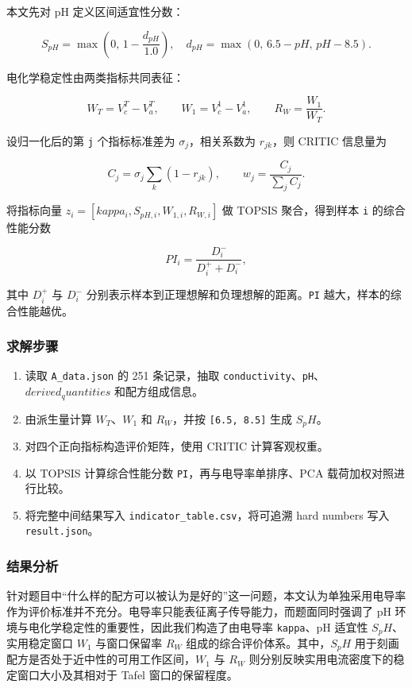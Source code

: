 \documentclass[bwprint]{gmcmthesis}
\numberwithin{figure}{section}
\begin{document}
本文先对 pH 定义区间适宜性分数：\par

\[
S_{pH}=\max \left(0,\, 1-\frac{d_{pH}}{1.0}\right),
\quad
d_{pH}=\max(0,\, 6.5-pH,\, pH-8.5).
\]

电化学稳定性由两类指标共同表征：\par

\[
W_T = V_c^T - V_a^T,\qquad
W_1 = V_c^1 - V_a^1,\qquad
R_W = \frac{W_1}{W_T}.
\]

设归一化后的第 \texttt{j} 个指标标准差为 $\sigma_j$，相关系数为 $r_{jk}$，则 CRITIC 信息量为\par

\[
C_j = \sigma_j \sum_k (1-r_{jk}), \qquad
w_j = \frac{C_j}{\sum_j C_j}.
\]

将指标向量 $z_i=[kappa_i,S_{pH,i},W_{1,i},R_{W,i}]$ 做 TOPSIS 聚合，得到样本 \texttt{i} 的综合性能分数\par

\[
PI_i=\frac{D_i^-}{D_i^+ + D_i^-},
\]

其中 $D_i^+$ 与 $D_i^-$ 分别表示样本到正理想解和负理想解的距离。\texttt{PI} 越大，样本的综合性能越优。\par

\subsubsection{求解步骤}

\begin{enumerate}
\item 读取 \texttt{A\_data.json} 的 251 条记录，抽取 \texttt{conductivity}、\texttt{pH}、$derived_quantities$ 和配方组成信息。
\item 由派生量计算 $W_T$、$W_1$ 和 $R_W$，并按 \texttt{[6.5, 8.5]} 生成 $S_pH$。
\item 对四个正向指标构造评价矩阵，使用 CRITIC 计算客观权重。
\item 以 TOPSIS 计算综合性能分数 \texttt{PI}，再与电导率单排序、PCA 载荷加权对照进行比较。
\item 将完整中间结果写入 \texttt{indicator\_table.csv}，将可追溯 hard numbers 写入 \texttt{result.json}。
\end{enumerate}

\subsubsection{结果分析}

针对题目中“什么样的配方可以被认为是好的”这一问题，本文认为单独采用电导率作为评价标准并不充分。电导率只能表征离子传导能力，而题面同时强调了 pH 环境与电化学稳定性的重要性，因此我们构造了由电导率 \texttt{kappa}、pH 适宜性 $S_pH$、实用稳定窗口 $W_1$ 与窗口保留率 $R_W$ 组成的综合评价体系。其中，$S_pH$ 用于刻画配方是否处于近中性的可用工作区间，$W_1$ 与 $R_W$ 则分别反映实用电流密度下的稳定窗口大小及其相对于 Tafel 窗口的保留程度。\par
\end{document}
